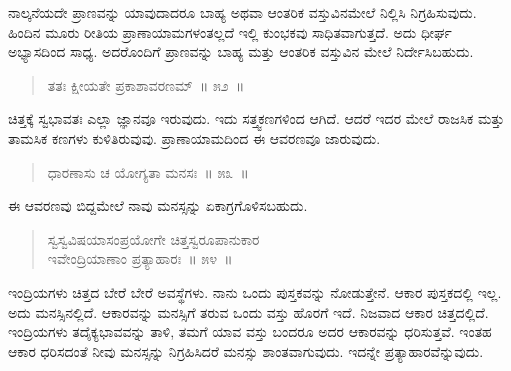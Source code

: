 \vspace{0.1cm}

ನಾಲ್ಕನೆಯದೇ ಪ್ರಾಣವನ್ನು ಯಾವುದಾದರೂ ಬಾಹ್ಯ ಅಥವಾ ಆಂತರಿಕ ವಸ್ತುವಿನಮೇಲೆ ನಿಲ್ಲಿಸಿ ನಿಗ್ರಹಿಸುವುದು. ಹಿಂದಿನ ಮೂರು ರೀತಿಯ ಪ್ರಾಣಾಯಾಮಗಳಂತಲ್ಲದೆ ಇಲ್ಲಿ ಕುಂಭಕವು ಸಾಧಿತವಾಗುತ್ತದೆ. ಅದು ಧೀರ್ಘ ಅಭ್ಯಾಸದಿಂದ ಸಾಧ್ಯ. ಅದರೊಂದಿಗೆ ಪ್ರಾಣವನ್ನು ಬಾಹ್ಯ ಮತ್ತು ಆಂತರಿಕ ವಸ್ತುವಿನ ಮೇಲೆ ನಿರ್ದೇಸಿಬಹುದು. 

\vspace{-0.2cm}

\begin{verse}
ತತಃ ಕ್ಷೀಯತೇ ಪ್ರಕಾಶಾವರಣಮ್​~॥ ೫೨~॥
\end{verse}

\vspace{-0.4cm}


\vspace{0.1cm}

ಚಿತ್ತಕ್ಕೆ ಸ್ವಭಾವತಃ ಎಲ್ಲಾ ಜ್ಞಾನವೂ ಇರುವುದು. ಇದು ಸತ್ತ್ವಕಣಗಳಿಂದ ಆಗಿದೆ. ಆದರೆ ಇದರ ಮೇಲೆ ರಾಜಸಿಕ ಮತ್ತು ತಾಮಸಿಕ ಕಣಗಳು ಕುಳಿತಿರುವುವು. ಪ್ರಾಣಾಯಾಮದಿಂದ ಈ ಆವರಣವೂ ಜಾರುವುದು. 

\vspace{-0.2cm}

\begin{verse}
ಧಾರಣಾಸು ಚ ಯೋಗ್ಯತಾ ಮನಸಃ~॥ ೫೩~॥
\end{verse}

\vspace{-0.4cm}


\vspace{0.2cm}

ಈ ಆವರಣವು ಬಿದ್ದಮೇಲೆ ನಾವು ಮನಸ್ಸನ್ನು ಏಕಾಗ್ರಗೊಳಿಸಬಹುದು. 


\begin{verse}
ಸ್ವಸ್ವವಿಷಯಾಸಂಪ್ರಯೋಗೇ ಚಿತ್ತಸ್ವರೂಪಾನುಕಾರ\\ ಇವೇಂದ್ರಿಯಾಣಾಂ ಪ್ರತ್ಯಾಹಾರಃ~॥ ೫೪~॥
\end{verse}

\vspace{-0.3cm}


\vspace{0.2cm}

ಇಂದ್ರಿಯಗಳು ಚಿತ್ತದ ಬೇರೆ ಬೇರೆ ಅವಸ್ಥೆಗಳು. ನಾನು ಒಂದು ಪುಸ್ತಕವನ್ನು ನೋಡುತ್ತೇನೆ. ಆಕಾರ ಪುಸ್ತಕದಲ್ಲಿ ಇಲ್ಲ. ಅದು ಮನಸ್ಸಿನಲ್ಲಿದೆ. ಆಕಾರವನ್ನು ಮನಸ್ಸಿಗೆ ತರುವ ಒಂದು ವಸ್ತು ಹೊರಗೆ ಇದೆ. ನಿಜವಾದ ಆಕಾರ ಚಿತ್ತದಲ್ಲಿದೆ. ಇಂದ್ರಿಯಗಳು ತದೈಕ್ಯಭಾವವನ್ನು ತಾಳಿ, ತಮಗೆ ಯಾವ ವಸ್ತು ಬಂದರೂ ಅದರ ಆಕಾರವನ್ನು ಧರಿಸುತ್ತವೆ. ಇಂತಹ ಆಕಾರ ಧರಿಸದಂತೆ ನೀವು ಮನಸ್ಸನ್ನು ನಿಗ್ರಹಿಸಿದರೆ ಮನಸ್ಸು ಶಾಂತವಾಗುವುದು. ಇದನ್ನೇ ಪ್ರತ್ಯಾಹಾರವೆನ್ನುವುದು. 


